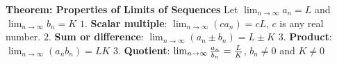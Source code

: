 \nopagenumbers
{\bf Theorem: Properties of Limits of Sequences}
\vskip 6pt
Let $\lim_{n\to\infty}a_n=L$ and $\lim_{n\to\infty}b_n=K$
\vskip 10pt
$1.$ {\bf Scalar multiple}: $\lim_{n\to\infty}(ca_n)=cL$, $c$ is any real number.
\vskip 1mm
$2.$ {\bf Sum or difference}: $\lim_{n\to\infty}(a_n\pm b_n)=L\pm K$
\vskip 1mm
$3.$ {\bf Product}: $\lim_{n\to\infty}(a_nb_n)=LK$
\vskip 1mm
$3.$ {\bf Quotient}: $\lim_{n\to\infty}{a_n\over b_n}={L\over K}$, $b_n \neq 0$ and $K \neq 0$
\vfill\eject
